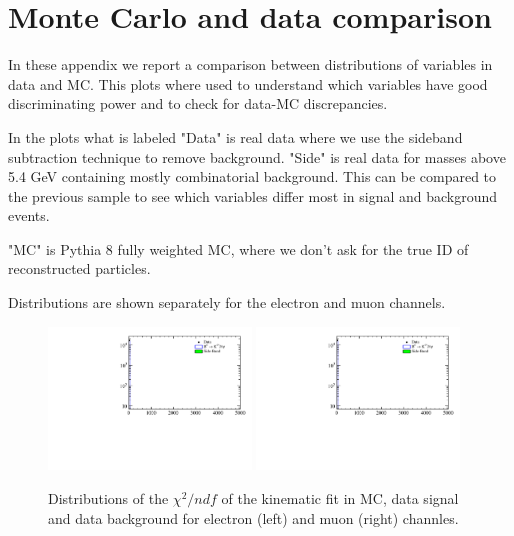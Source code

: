 \section{Monte Carlo and data comparison}
\label{app:MC_data_comp}

In these appendix we report a comparison between distributions of variables in data and MC.
This plots where used to understand which variables have good discriminating power and to check for
data-MC discrepancies.


In the plots what is labeled "Data" is real data %
where we use the sideband subtraction technique to remove background.
"Side" is real data for masses above 5.4 GeV containing mostly combinatorial background.
This can be compared to the previous sample to see which variables differ most in signal and background events.
 
"MC" is Pythia 8 \Bz\to\Kstar\jpsi fully weighted MC, where we don't ask for the true ID of reconstructed particles.

Distributions are shown separately for the electron and muon channels.


\begin{figure}[h!]
\centering
\includegraphics[width=0.48\textwidth]{RKst/figs/MC_data_comp/EE/drawVariables_B0_DTF_PV_chi2_B0_DTF_PV_nDOF.pdf}
\includegraphics[width=0.48\textwidth]{RKst/figs/MC_data_comp/MM/drawVariables_B0_DTF_PV_chi2_B0_DTF_PV_nDOF.pdf}
\caption{ Distributions of the $\chi^2/ndf$ of the kinematic fit in MC, data signal and data background for electron (left) and muon (right) channles.   }
\end{figure}

